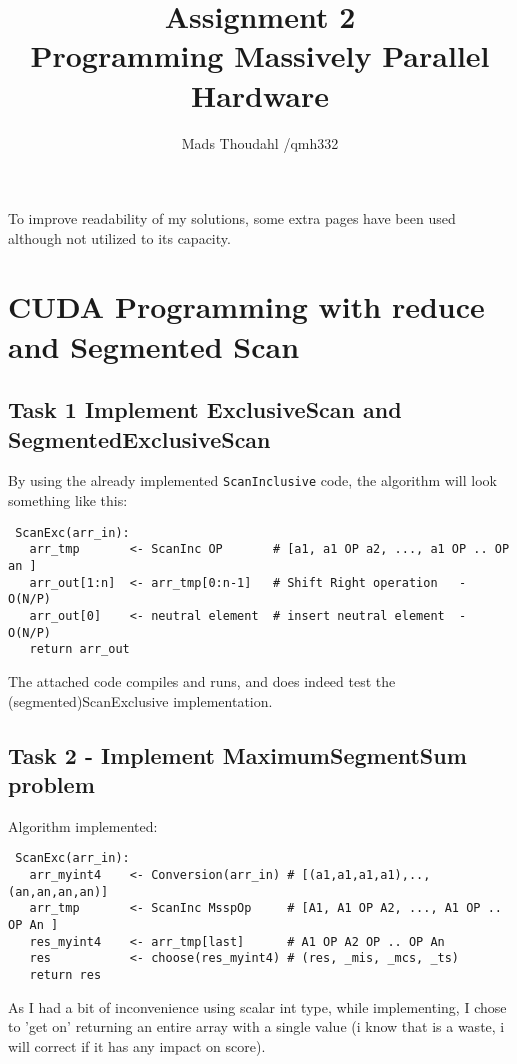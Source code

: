 \documentclass[a4paper,10pt]{article}
\title{Assignment 2  \\Programming Massively Parallel Hardware }
\author{Mads Thoudahl /qmh332}
\begin{document}
\maketitle

To improve readability of my solutions, some extra pages have been used although not utilized to its capacity.

\section{CUDA Programming with reduce and Segmented Scan}
\subsection{Task 1 Implement ExclusiveScan and SegmentedExclusiveScan}
By using the already implemented \texttt{ScanInclusive} code, the algorithm will look something like this:

\begin{verbatim}
 ScanExc(arr_in):
   arr_tmp       <- ScanInc OP       # [a1, a1 OP a2, ..., a1 OP .. OP an ]
   arr_out[1:n]  <- arr_tmp[0:n-1]   # Shift Right operation   - O(N/P)
   arr_out[0]    <- neutral element  # insert neutral element  - O(N/P)
   return arr_out
\end{verbatim}

The attached code compiles and runs, and does indeed test the (segmented)ScanExclusive implementation.



\subsection{Task 2 - Implement MaximumSegmentSum problem}
Algorithm implemented:
\begin{verbatim}
 ScanExc(arr_in):
   arr_myint4    <- Conversion(arr_in) # [(a1,a1,a1,a1),..,(an,an,an,an)]
   arr_tmp       <- ScanInc MsspOp     # [A1, A1 OP A2, ..., A1 OP .. OP An ]
   res_myint4    <- arr_tmp[last]      # A1 OP A2 OP .. OP An
   res           <- choose(res_myint4) # (res, _mis, _mcs, _ts)
   return res
\end{verbatim}
As I had a bit of inconvenience using scalar int type, while implementing, I chose to 'get on' returning an entire array with a single value (i know that is a waste, i will correct if it has any impact on score).
\end{document}

